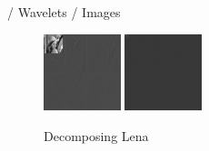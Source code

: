 \documentclass{beamer}
\def\RImageSize{0.2\textwidth}
\def\RImageSpace{\hspace{1cm}}
\begin{document}
\begin{frame}{/ Wavelets / Images}
\begin{figure}[hbt]
\begin{center}
    \end{center}
  \end{figure}
  \begin{figure}[hbt]
    \begin{center}
      \includegraphics[width=\RImageSize]{lena-2step.jpg}
      \RImageSpace
      \includegraphics[width=\RImageSize]{lena-9step.jpg}
      \caption{Decomposing Lena}
    \end{center}
  \end{figure}

\end{frame}
\end{document}
